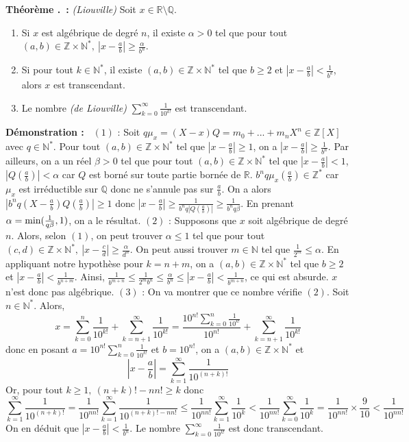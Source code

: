 \documentclass[5pt,a4paper]{article}
\newcounter{thm}[section]
\renewcommand{\thethm}{\thesection.\arabic{thm}}
\newcommand{\thmEnum}[1]{\stepcounter{thm}\noindent\textbf{Théorème \thethm ~:} #1}
\newcommand{\demo}[1]{\textbf{Démonstration :~} #1 \newline}
\begin{document}
\begin{onehalfspacing}
\thmEnum{\textit{(Liouville)} Soit $x \in \mathbb{R} \setminus \mathbb{Q}$. 
	\begin{enumerate}
	\item Si $x$ est algébrique de degré $n$, il existe $\alpha > 0$ tel que pour tout $(a,b) \in \mathbb{Z} \times \mathbb{N}^*,~|x - \frac{a}{b}| \geq \frac{\alpha}{b^n}$.
	\item Si pour tout $k \in \mathbb{N}^*$, il existe $(a,b) \in \mathbb{Z} \times \mathbb{N}^*$ tel que $b \geq 2$ et $|x - \frac{a}{b}| < \frac{1}{b^k}$, alors $x$ est transcendant.
	\item Le nombre \textit{(de Liouville)} $\sum_{k=0}^{\infty} \frac{1}{10^{k!}}$ est transcendant.
	\end{enumerate}
}
\demo{$(1)$ : Soit $q\mu_x = (X - x)Q = m_0 + ... + m_nX^n \in \mathbb{Z}[X]$ avec $q \in \mathbb{N}^*$. Pour tout $(a,b) \in \mathbb{Z} \times \mathbb{N}^*$ tel que $|x - \frac{a}{b}| \geq 1$, on a $|x - \frac{a}{b}| \geq \frac{1}{b^n}$. Par ailleurs, on a un réel $\beta > 0$ tel que pour tout $(a,b) \in \mathbb{Z} \times \mathbb{N}^*$ tel que $|x - \frac{a}{b}| < 1$, $|Q(\frac{a}{b})| < \alpha$ car $Q$ est borné sur toute partie bornée de $\mathbb{R}$. $b^nq\mu_x(\frac{a}{b}) \in \mathbb{Z}^*$ car $\mu_x$ est irréductible sur $\mathbb{Q}$ donc ne s'annule pas sur $\frac{a}{b}$. On a alors $|b^nq(X - \frac{a}{b})Q(\frac{a}{b})| \geq 1$ donc $|x - \frac{a}{b}| \geq \frac{1}{b^nq|Q(\frac{a}{b})|} \geq  \frac{1}{b^nq\beta}$. En prenant $\alpha = \textup{min}(\frac{1}{q\beta}, 1)$, on a le résultat. $(2)$ : Supposons que $x$ soit algébrique de degré $n$. Alors, selon $(1)$, on peut trouver $\alpha \leq 1$ tel que pour tout $(c,d) \in \mathbb{Z} \times \mathbb{N}^*,~|x - \frac{c}{d}| \geq \frac{\alpha}{d^n}$. On peut aussi trouver $m \in \mathbb{N}$ tel que $\frac{1}{2^m} \leq \alpha$. En appliquant notre hypothèse pour $k = n+m$, on a $(a,b) \in \mathbb{Z} \times \mathbb{N}^*$ tel que $b \geq 2$ et $|x - \frac{a}{b}| < \frac{1}{b^{n+m}}$. Ainsi, $\frac{1}{b^{m+n}} \leq \frac{1}{2^mb^n} \leq \frac{\alpha}{b^n} \leq |x - \frac{a}{b}| < \frac{1}{b^{m+n}}$, ce qui est absurde. $x$ n'est donc pas algébrique. $(3)$ : On va montrer que ce nombre vérifie $(2)$. Soit $n \in \mathbb{N}^*$. Alors,
\[x = \sum_{k=0}^n \frac{1}{10^{k!}} + \sum_{k=n+1}^\infty \frac{1}{10^{k!}} = \frac{10^{n!}\sum_{k=0}^n \frac{1}{10^{k!}}}{10^{n!}} + \sum_{k=n+1}^\infty \frac{1}{10^{k!}}\]
donc en posant $a = 10^{n!}\sum_{k=0}^n \frac{1}{10^{k!}}$ et $b = 10^{n!}$, on a $(a,b) \in \mathbb{Z}\times \mathbb{N}^*$ et
\[|x - \frac{a}{b}| = \sum_{k=1}^\infty \frac{1}{10^{(n+k)!}}\]
Or, pour tout $k \geq 1,~(n+k)! - nn! \geq k$ donc
\[\sum_{k=1}^\infty \frac{1}{10^{(n+k)!}} = \frac{1}{10^{nn!}}\sum_{k=1}^\infty \frac{1}{10^{(n+k)! - nn!}} \leq \frac{1}{10^{nn!}}\sum_{k=1}^\infty \frac{1}{10^k} < \frac{1}{10^{nn!}}\sum_{k=0}^\infty \frac{1}{10^k} = \frac{1}{10^{nn!}} \times \frac{9}{10} < \frac{1}{10^{nn!}}\]
On en déduit que $|x - \frac{a}{b}| < \frac{1}{b^n}$. Le nombre $\sum_{k=0}^{\infty} \frac{1}{10^{k!}}$ est donc transcendant.
}


\end{onehalfspacing}
\end{document}

